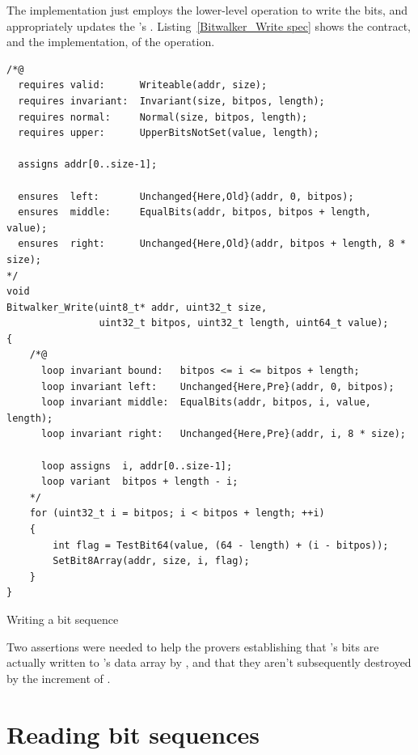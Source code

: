 \FloatBarrier


The implementation just employs the lower-level operation
 to
write the bits, and appropriately updates the 's
.
%
Listing~\ref{Bitwalker_Write spec} shows the contract, and the
implementation, of the
 operation.

\begin{listing}[hbt]
\begin{minipage}{0.99\textwidth}
\begin{lstlisting}[style=acsl-block]
/*@
  requires valid:      Writeable(addr, size);
  requires invariant:  Invariant(size, bitpos, length);
  requires normal:     Normal(size, bitpos, length);
  requires upper:      UpperBitsNotSet(value, length);

  assigns addr[0..size-1];

  ensures  left:       Unchanged{Here,Old}(addr, 0, bitpos);
  ensures  middle:     EqualBits(addr, bitpos, bitpos + length, value);
  ensures  right:      Unchanged{Here,Old}(addr, bitpos + length, 8 * size);
*/
void
Bitwalker_Write(uint8_t* addr, uint32_t size,
                uint32_t bitpos, uint32_t length, uint64_t value);
{
    /*@
      loop invariant bound:   bitpos <= i <= bitpos + length;
      loop invariant left:    Unchanged{Here,Pre}(addr, 0, bitpos);
      loop invariant middle:  EqualBits(addr, bitpos, i, value, length);
      loop invariant right:   Unchanged{Here,Pre}(addr, i, 8 * size);

      loop assigns  i, addr[0..size-1];
      loop variant  bitpos + length - i;
    */
    for (uint32_t i = bitpos; i < bitpos + length; ++i)
    {
        int flag = TestBit64(value, (64 - length) + (i - bitpos));
        SetBit8Array(addr, size, i, flag);
    }   
}

\end{lstlisting}
\end{minipage}
\caption{\label{Bitwalker_Write spec}Writing a bit sequence}
\end{listing}

Two assertions were needed to help the provers establishing that
's
bits are actually written to 's data array by
, and that they aren't subsequently destroyed by
the increment of .

\clearpage

\section{Reading bit sequences}
\label{sec:reading bit sequences}

